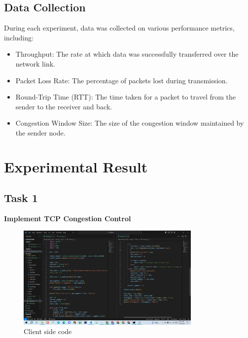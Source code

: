 \documentclass[11pt]{article}
\begin{document}
\subsection{Data Collection}

During each experiment, data was collected on various performance metrics, including:

\begin{itemize}
    \item Throughput: The rate at which data was successfully transferred over the network link.
    \item Packet Loss Rate: The percentage of packets lost during transmission.
    \item Round-Trip Time (RTT): The time taken for a packet to travel from the sender to the receiver and back.
    \item Congestion Window Size: The size of the congestion window maintained by the sender node.
\end{itemize}






\newpagepage

\section{Experimental Result}

\subsection{Task 1}



    \item \textbf{Implement TCP Congestion Control}

    
    
   


    \begin{figure}[H]
        \centering
        \includegraphics[width=0.8\textwidth]{Screenshot (181).png}
        \caption{Client side code}
        \label{fig:1}
    \end{figure}
    
\end{document}
